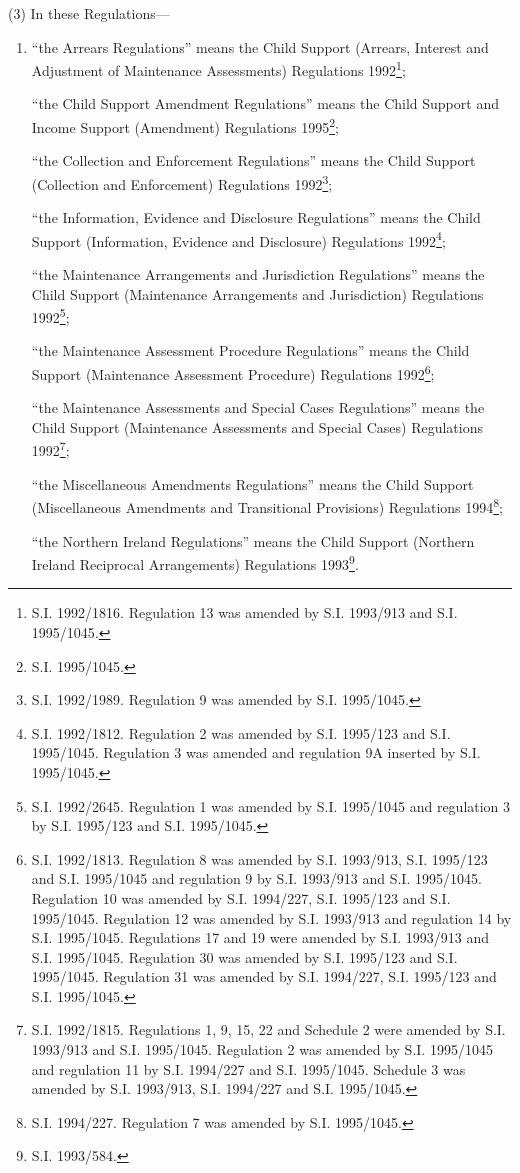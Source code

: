 \documentclass[12pt,a4paper]{article}
\begin{document}
(3) In these Regulations—
\begin{enumerate}\item[]
“the Arrears Regulations” means the Child Support (Arrears, Interest and Adjustment of Maintenance Assessments) Regulations 1992\footnote{\frenchspacing S.I. 1992/1816. Regulation 13 was amended by S.I. 1993/913 and S.I. 1995/1045.};

“the Child Support Amendment Regulations” means the Child Support and Income Support (Amendment) Regulations 1995\footnote{\frenchspacing S.I. 1995/1045.};

“the Collection and Enforcement Regulations” means the Child Support (Collection and Enforcement) Regulations 1992\footnote{\frenchspacing S.I. 1992/1989. Regulation 9 was amended by S.I. 1995/1045.};

“the Information, Evidence and Disclosure Regulations” means the Child Support (Information, Evidence and Disclosure) Regulations 1992\footnote{\frenchspacing S.I. 1992/1812. Regulation 2 was amended by S.I. 1995/123 and S.I. 1995/1045. Regulation 3 was amended and regulation 9A inserted by S.I. 1995/1045.};

“the Maintenance Arrangements and Jurisdiction Regulations” means the Child Support (Maintenance Arrangements and Jurisdiction) Regulations 1992\footnote{\frenchspacing S.I. 1992/2645. Regulation 1 was amended by S.I. 1995/1045 and regulation 3 by S.I. 1995/123 and S.I. 1995/1045.};

“the Maintenance Assessment Procedure Regulations” means the Child Support (Maintenance Assessment Procedure) Regulations 1992\footnote{\frenchspacing S.I. 1992/1813. Regulation 8 was amended by S.I. 1993/913, S.I. 1995/123 and S.I. 1995/1045 and regulation 9 by S.I. 1993/913 and S.I. 1995/1045. Regulation 10 was amended by S.I. 1994/227, S.I. 1995/123 and S.I. 1995/1045. Regulation 12 was amended by S.I. 1993/913 and regulation 14 by S.I. 1995/1045. Regulations 17 and 19 were amended by S.I. 1993/913 and S.I. 1995/1045. Regulation 30 was amended by S.I. 1995/123 and S.I. 1995/1045. Regulation 31 was amended by S.I. 1994/227, S.I. 1995/123 and S.I. 1995/1045.};

“the Maintenance Assessments and Special Cases Regulations” means the Child Support (Maintenance Assessments and Special Cases) Regulations 1992\footnote{\frenchspacing S.I. 1992/1815. Regulations 1, 9, 15, 22 and Schedule 2 were amended by S.I. 1993/913 and S.I. 1995/1045. Regulation 2 was amended by S.I. 1995/1045 and regulation 11 by S.I. 1994/227 and S.I. 1995/1045. Schedule 3 was amended by S.I. 1993/913, S.I. 1994/227 and S.I. 1995/1045.};

“the Miscellaneous Amendments Regulations” means the Child Support (Miscellaneous Amendments and Transitional Provisions) Regulations 1994\footnote{\frenchspacing S.I. 1994/227. Regulation 7 was amended by S.I. 1995/1045.};

“the Northern Ireland Regulations” means the Child Support (Northern Ireland Reciprocal Arrangements) Regulations 1993\footnote{\frenchspacing S.I. 1993/584.}.
\end{enumerate}
\end{document}
